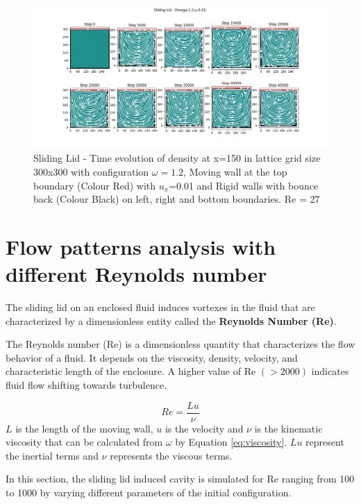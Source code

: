 \documentclass[a4paper,11pt]{report}
\begin{document}
\begin{figure}[h!]
  \begin{center}
   \includegraphics[width=\textwidth]{HPC_report/images/sliding_lid/Streamplot.png}
   \caption{Sliding Lid - Time evolution of density at x=150 in lattice grid size 300x300 with configuration $\omega = 1.2$, Moving wall at the top boundary (Colour Red) with $u_x$=0.01 and Rigid walls with bounce back (Colour Black) on left, right and bottom boundaries. Re = 27}
  \label{fig:sl_stream}
  \end{center}
\end{figure} 


\section{Flow patterns analysis with different Reynolds number}
The sliding lid on an enclosed fluid induces vortexes in the fluid that are characterized by a dimensionless entity called the \textbf{Reynolds Number (Re)}. 

The Reynolds number (Re) is a dimensionless quantity that characterizes the flow behavior of a fluid. It depends on the viscosity, density, velocity, and characteristic length of the enclosure. A higher value of Re $(> 2000)$ indicates fluid flow shifting towards turbulence. \cite{Re_Chiang1998EffectOR}

\begin{equation}
    Re = \frac{Lu}{\nu}
\end{equation}
$L$ is the length of the moving wall, $u$ is the velocity and $\nu$ is the kinematic viscosity that can be calculated from $\omega$ by Equation \ref{eq:viscosity}. $Lu$ represent the inertial terms and $\nu$ represents the viscous terms.

In this section, the sliding lid induced cavity is simulated for Re ranging from 100 to 1000 by varying different parameters of the initial configuration.
\end{document}
